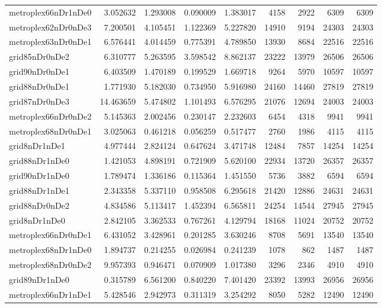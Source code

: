 \begin{longtable}{|l|r|r|r|r|r|r|r|r|}
metroplex66nDr1nDe0 & 3.052632 & 1.293008 & 0.090009 & 1.383017 & 4158 & 2922 & 6309 & 6309 \\
metroplex62nDr0nDe3 & 7.200501 & 4.105451 & 1.122369 & 5.227820 & 14910 & 9194 & 24303 & 24303 \\
metroplex63nDr0nDe1 & 6.576441 & 4.014459 & 0.775391 & 4.789850 & 13930 & 8684 & 22516 & 22516 \\
grid85nDr0nDe2 & 6.310777 & 5.263595 & 3.598542 & 8.862137 & 23222 & 13979 & 26506 & 26506 \\
grid90nDr0nDe1 & 6.403509 & 1.470189 & 0.199529 & 1.669718 & 9264 & 5970 & 10597 & 10597 \\
grid88nDr0nDe1 & 1.771930 & 5.182030 & 0.734950 & 5.916980 & 24160 & 14460 & 27819 & 27819 \\
grid87nDr0nDe3 & 14.463659 & 5.474802 & 1.101493 & 6.576295 & 21076 & 12694 & 24003 & 24003 \\
metroplex66nDr0nDe2 & 5.145363 & 2.002456 & 0.230147 & 2.232603 & 6454 & 4318 & 9941 & 9941 \\
metroplex68nDr0nDe1 & 3.025063 & 0.461218 & 0.056259 & 0.517477 & 2760 & 1986 & 4115 & 4115 \\
grid8nDr1nDe1 & 4.977444 & 2.824124 & 0.647624 & 3.471748 & 12484 & 7857 & 14254 & 14254 \\
grid88nDr1nDe0 & 1.421053 & 4.898191 & 0.721909 & 5.620100 & 22934 & 13720 & 26357 & 26357 \\
grid90nDr1nDe0 & 1.789474 & 1.336186 & 0.115364 & 1.451550 & 5736 & 3882 & 6594 & 6594 \\
grid88nDr1nDe1 & 2.343358 & 5.337110 & 0.958508 & 6.295618 & 21420 & 12886 & 24631 & 24631 \\
grid88nDr0nDe2 & 4.834586 & 5.113417 & 1.452394 & 6.565811 & 24254 & 14544 & 27945 & 27945 \\
grid8nDr1nDe0 & 2.842105 & 3.362533 & 0.767261 & 4.129794 & 18168 & 11024 & 20752 & 20752 \\
metroplex66nDr0nDe1 & 6.431052 & 3.428961 & 0.201285 & 3.630246 & 8708 & 5691 & 13540 & 13540 \\
metroplex68nDr1nDe0 & 1.894737 & 0.214255 & 0.026984 & 0.241239 & 1078 & 862 & 1487 & 1487 \\
metroplex68nDr0nDe2 & 9.957393 & 0.946471 & 0.070909 & 1.017380 & 3296 & 2346 & 4910 & 4910 \\
grid89nDr1nDe0 & 0.315789 & 6.561200 & 0.840220 & 7.401420 & 23392 & 13993 & 26956 & 26956 \\
metroplex66nDr1nDe1 & 5.428546 & 2.942973 & 0.311319 & 3.254292 & 8050 & 5282 & 12490 & 12490 \\

\end{longtable}
